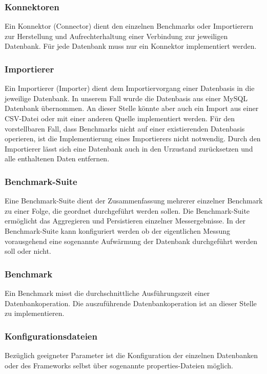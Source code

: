 \documentclass[11pt, a4paper, oneside, twocolumn]{article} %
\begin{document}
\subsubsection{Konnektoren}
Ein Konnektor (Connector) dient den einzelnen Benchmarks oder Importierern zur Herstellung und Aufrechterhaltung einer Verbindung zur jeweiligen Datenbank. Für jede Datenbank muss nur ein Konnektor implementiert werden.

\subsubsection{Importierer}
Ein Importierer (Importer) dient dem Importiervorgang einer Datenbasis in die jeweilige Datenbank. In unserem Fall wurde die Datenbasis aus einer MySQL Datenbank übernommen. An dieser Stelle könnte aber auch ein Import aus einer CSV-Datei oder mit einer anderen Quelle implementiert werden. Für den vorstellbaren Fall, dass Benchmarks nicht auf einer existierenden Datenbasis operieren, ist die Implementierung eines Importierers nicht notwendig. Durch den Importierer lässt sich eine Datenbank auch in den Urzustand zurücksetzen und alle enthaltenen Daten entfernen.

\subsubsection{Benchmark-Suite}
Eine Benchmark-Suite dient der Zusammenfassung mehrerer einzelner Benchmark zu einer Folge, die geordnet durchgeführt werden sollen. Die Benchmark-Suite ermöglicht das Aggregieren und Persistieren einzelner Messergebnisse. In der Benchmark-Suite kann konfiguriert werden ob der eigentlichen Messung vorausgehend eine sogenannte Aufwärmung der Datenbank durchgeführt werden soll oder nicht.

\subsubsection{Benchmark}
Ein Benchmark misst die durchschnittliche Ausführungszeit einer Datenbankoperation. Die auszuführende Datenbankoperation ist an dieser Stelle zu implementieren.

\subsubsection{Konfigurationsdateien}
Bezüglich geeigneter Parameter ist die Konfiguration der einzelnen Datenbanken oder des Frameworks selbst über sogenannte properties-Dateien möglich.
\end{document}
